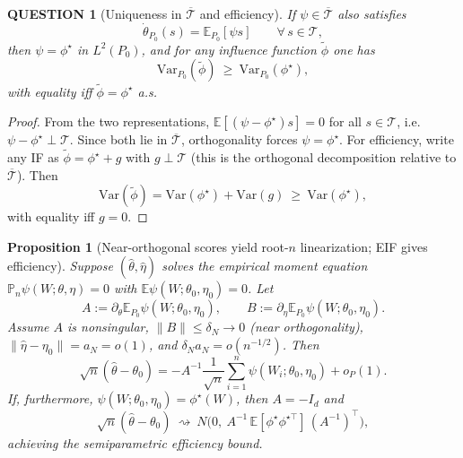 \documentclass[12pt]{article}
\renewcommand{\(}{\left(}%
\renewcommand{\)}{\right)}%
\renewcommand{\[}{\left[}%
\renewcommand{\]}{\right]}%
\newtheorem{question}{QUESTION}[section]}
\newtheorem{proposition}{Proposition}[section]}
\newtheorem{proof}{Proof.}}
\begin{document}
\begin{question}[Uniqueness in $\overline{\mathcal T}$ and efficiency]
    If $\psi\in\overline{\mathcal T}$ also satisfies
\begin{equation*}
\dot\theta_{P_0}(s)=\mathbb E_{P_0}[\psi s]\qquad\forall\, s\in\mathcal T,
\end{equation*}
then $\psi=\phi^\star$ in $L^2(P_0)$, and for any influence function $\tilde\phi$ one has
\begin{equation*}
\mathrm{Var}_{P_0}(\tilde\phi)\ \ge\ \mathrm{Var}_{P_0}(\phi^\star),
\end{equation*}
with equality iff $\tilde\phi=\phi^\star$ a.s.
\end{question}


\begin{proof}
From the two representations, $\mathbb E[(\psi-\phi^\star)s]=0$ for all $s\in\mathcal T$, i.e.\ $\psi-\phi^\star\perp\mathcal T$. Since both lie in $\overline{\mathcal T}$, orthogonality forces $\psi=\phi^\star$. For efficiency, write any IF as $\tilde\phi=\phi^\star+g$ with $g\perp\mathcal T$ (this is the orthogonal decomposition relative to $\overline{\mathcal T}$). Then
\begin{equation*}
\mathrm{Var}(\tilde\phi)=\mathrm{Var}(\phi^\star)+\mathrm{Var}(g)\ \ge\ \mathrm{Var}(\phi^\star),
\end{equation*}
with equality iff $g=0$.
\end{proof}

\begin{proposition}[Near-orthogonal scores yield root-$n$ linearization; EIF gives efficiency]
Suppose $(\hat\theta,\hat\eta)$ solves the empirical moment equation $\mathbb P_n\psi(W;\theta,\eta)=0$ with $\mathbb E\psi(W;\theta_0,\eta_0)=0$. Let
\begin{equation*}
A:=\partial_\theta \mathbb E_{P_0}\psi(W;\theta_0,\eta_0),\qquad
B:=\partial_\eta \mathbb E_{P_0}\psi(W;\theta_0,\eta_0).
\end{equation*}
Assume $A$ is nonsingular, $\|B\|\le \delta_N\to 0$ (near orthogonality), $\|\hat\eta-\eta_0\|=a_N=o(1)$, and $\delta_N a_N=o(n^{-1/2})$. Then
\begin{equation*}
\sqrt n(\hat\theta-\theta_0)
=-A^{-1}\frac{1}{\sqrt n}\sum_{i=1}^n \psi(W_i;\theta_0,\eta_0)+o_P(1).
\end{equation*}
If, furthermore, $\psi(W;\theta_0,\eta_0)=\phi^\star(W)$, then $A=-I_d$ and
\begin{equation*}
\sqrt n(\hat\theta-\theta_0)\ \rightsquigarrow\ N\!\Big(0,\ A^{-1}\,\mathbb E[\phi^\star\phi^{\star\top}]\,(A^{-1})^\top\Big),
\end{equation*}
achieving the semiparametric efficiency bound.
\end{proposition}
\end{document}
